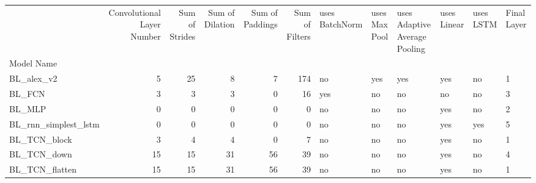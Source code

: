 \begin{tabular}{lrrrrrllllll}
{} & {Convolutional Layer Number} & {Sum of Strides} & {Sum of Dilation} & {Sum of Paddings} & {Sum of Filters} & {uses BatchNorm} & {uses Max Pool} & {uses Adaptive Average Pooling} & {uses Linear} & {uses LSTM} & {Final Layer} \\
{Model Name} & {} & {} & {} & {} & {} & {} & {} & {} & {} & {} & {} \\
BL\_alex\_v2 & {\cellcolor[HTML]{C2DFC2}} \color[HTML]{000000} 5 & {\cellcolor[HTML]{98CA98}} \color[HTML]{000000} 25 & {\cellcolor[HTML]{D7E9D7}} \color[HTML]{000000} 8 & {\cellcolor[HTML]{CDE5CD}} \color[HTML]{000000} 7 & {\cellcolor[HTML]{008000}} \color[HTML]{F1F1F1} 174 & no & yes & yes & yes & no & 1 \\
BL\_FCN & {\cellcolor[HTML]{D3E7D3}} \color[HTML]{000000} 3 & {\cellcolor[HTML]{E1EEE1}} \color[HTML]{000000} 3 & {\cellcolor[HTML]{E3EFE3}} \color[HTML]{000000} 3 & {\cellcolor[HTML]{EBF3EB}} \color[HTML]{000000} 0 & {\cellcolor[HTML]{D5E9D5}} \color[HTML]{000000} 16 & yes & no & no & no & no & 3 \\
BL\_MLP & {\cellcolor[HTML]{EBF3EB}} \color[HTML]{000000} 0 & {\cellcolor[HTML]{EBF3EB}} \color[HTML]{000000} 0 & {\cellcolor[HTML]{EBF3EB}} \color[HTML]{000000} 0 & {\cellcolor[HTML]{EBF3EB}} \color[HTML]{000000} 0 & {\cellcolor[HTML]{EBF3EB}} \color[HTML]{000000} 0 & no & no & no & yes & no & 2 \\
BL\_rnn\_simplest\_lstm & {\cellcolor[HTML]{EBF3EB}} \color[HTML]{000000} 0 & {\cellcolor[HTML]{EBF3EB}} \color[HTML]{000000} 0 & {\cellcolor[HTML]{EBF3EB}} \color[HTML]{000000} 0 & {\cellcolor[HTML]{EBF3EB}} \color[HTML]{000000} 0 & {\cellcolor[HTML]{EBF3EB}} \color[HTML]{000000} 0 & no & no & no & yes & yes & 5 \\
BL\_TCN\_block & {\cellcolor[HTML]{D3E7D3}} \color[HTML]{000000} 3 & {\cellcolor[HTML]{DEEDDE}} \color[HTML]{000000} 4 & {\cellcolor[HTML]{E1EEE1}} \color[HTML]{000000} 4 & {\cellcolor[HTML]{EBF3EB}} \color[HTML]{000000} 0 & {\cellcolor[HTML]{E1EEE1}} \color[HTML]{000000} 7 & no & no & no & yes & no & 1 \\
BL\_TCN\_down & {\cellcolor[HTML]{71B771}} \color[HTML]{F1F1F1} 15 & {\cellcolor[HTML]{B9DBB9}} \color[HTML]{000000} 15 & {\cellcolor[HTML]{9FCE9F}} \color[HTML]{000000} 31 & {\cellcolor[HTML]{008000}} \color[HTML]{F1F1F1} 56 & {\cellcolor[HTML]{B6D9B6}} \color[HTML]{000000} 39 & no & no & no & yes & no & 4 \\
BL\_TCN\_flatten & {\cellcolor[HTML]{71B771}} \color[HTML]{F1F1F1} 15 & {\cellcolor[HTML]{B9DBB9}} \color[HTML]{000000} 15 & {\cellcolor[HTML]{9FCE9F}} \color[HTML]{000000} 31 & {\cellcolor[HTML]{008000}} \color[HTML]{F1F1F1} 56 & {\cellcolor[HTML]{B6D9B6}} \color[HTML]{000000} 39 & no & no & no & yes & no & 1 \\

\end{tabular}
